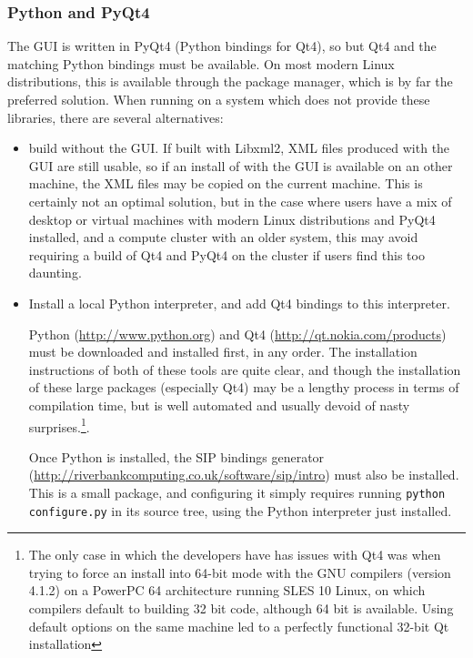 \documentclass[a4paper,10pt,twoside]{csshortdoc}
\begin{document}
\subsubsection{Python and PyQt4\label{sec:ext:python}}

The GUI is written in PyQt4 (Python bindings for Qt4), so but Qt4 and
the matching Python bindings must be available. On most modern
Linux distributions, this is available through the package manager,
which is by far the preferred solution. When running on a system which does
not provide these libraries, there are several alternatives:

\begin{itemize}

\item build \CS without the GUI. If built with Libxml2, XML files
      produced with the GUI are still usable, so if an install of \CS
      with the GUI is available on an other machine, the XML files
      may be copied on the current machine. This is certainly not an optimal
      solution, but in the case where users have a mix of desktop or virtual
      machines with modern Linux distributions and PyQt4 installed, and
      a compute cluster with an older system, this may avoid requiring
      a build of Qt4 and PyQt4 on the cluster if users find this too daunting.

\item Install a local Python interpreter, and add Qt4 bindings to this
      interpreter.

      Python (\url{http://www.python.org}) and Qt4
      (\url{http://qt.nokia.com/products}) must be downloaded  and
      installed first, in any order. The installation instructions of
      both of these tools are quite clear, and though the installation of these
      large packages (especially Qt4) may be a lengthy process in terms of
      compilation time, but is well automated and usually devoid of nasty
      surprises.\footnote{The only case in which the \CS developers
      have has issues with Qt4 was when trying to force an install into
      64-bit mode with the GNU compilers (version 4.1.2) on a PowerPC 64
      architecture running SLES 10 Linux, on which compilers default
      to building 32 bit code, although 64 bit is available. Using default
      options on the same machine led to a perfectly functional 32-bit Qt
      installation}.

      Once Python is installed, the SIP bindings generator
      (\url{http://riverbankcomputing.co.uk/software/sip/intro})
      must also be installed. This is a small package, and configuring it
      simply requires running \texttt{python configure.py} in its source
      tree, using the Python interpreter just installed.


\end{itemize}
\end{document}
